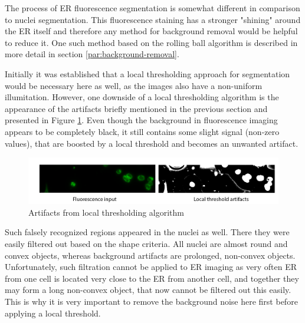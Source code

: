 The process of ER fluorescence segmentation is somewhat different in comparison to nuclei segmentation. This fluorescence staining has a stronger "shining" around the ER itself and therefore any method for background removal would be helpful to reduce it. One such method based on the rolling ball algorithm is described in more detail in section \ref{par:background-removal}.

Initially it was established that a local thresholding approach for segmentation would be necessary here as well, as the images also have a non-uniform illumitation. However, one downside of a local thresholding algorithm is the appearance of the artifacts briefly mentioned in the previous section and presented in Figure \ref{fig:artifacts-er}. Even though the background in fluorescence imaging appears to be completely black, it still contains some slight signal (non-zero values), that are boosted by a local threshold and becomes an unwanted artifact. 
\begin{figure}[H]
	\begin{center}
		\includegraphics[width=\linewidth]{bilder/ER/artifacts.png}
		\caption{Artifacts from local thresholding algorithm}\label{fig:artifacts-er}
	\end{center}
\end{figure}
Such falsely recognized regions appeared in the nuclei as well. There they were easily filtered out based on the shape criteria. All nuclei are almost round and convex objects, whereas background artifacts are prolonged, non-convex objects. Unfortunately, such filtration cannot be applied to ER imaging as very often ER from one cell is located very close to the ER from another cell, and together they may form a long non-convex object, that now cannot be filtered out this easily. This is why it is very important to remove the background noise here first before applying a local threshold.

